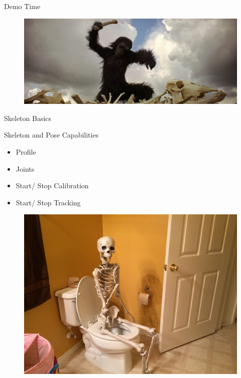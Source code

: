 \documentclass[bigger]{beamer}
\begin{document}
\begin{frame}{ Demo Time}
\begin{figure}[h]
		\includegraphics[scale = 0.15]{Imagenes/demo.png}
\end{figure}
\end{frame}


\begin{frame}{ Skeleton Basics}
\begin{minipage}{0.45\textwidth}
Skeleton and Pose Capabilities
\begin{itemize}
	\item Profile
	\item Joints
	\item Start/ Stop Calibration
	\item Start/ Stop Tracking
\end{itemize}
\end{minipage}
\begin{minipage}{0.45\textwidth}
\begin{figure}[h]
		\includegraphics[scale = 0.05]{Imagenes/skeleton.jpg}
\end{figure}
\end{minipage}

\end{frame}
\end{document}
